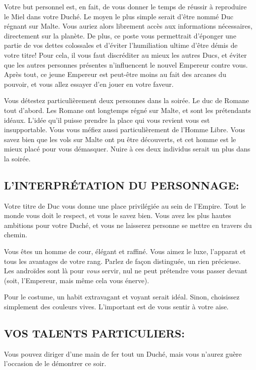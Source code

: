 \documentclass[14pt,twocolumn]{extarticle}
\begin{document}
Votre but personnel est, en fait, de vous donner le temps de réussir à
reproduire le Miel dans votre Duché. Le moyen le plus simple serait d'être
nommé Duc régnant sur Malte. Vous auriez alors librement accès aux informations
nécessaires, directement sur la planète. De plus, ce poste vous permettrait
d'éponger une partie de vos dettes colossales et d'éviter l'humiliation ultime
d'être démis de votre titre! Pour cela, il vous faut discréditer au mieux les
autres Ducs, et éviter que les autres personnes présentes n'influencent le
nouvel Empereur contre vous.  Après tout, ce jeune Empereur est peut-être moins
au fait des arcanes du pouvoir, et vous allez essayer d'en jouer en votre
faveur.

Vous détestez particulièrement deux personnes dans la soirée. Le duc de Romane
tout d'abord. Les Romane ont longtemps régné sur Malte, et sont les prétendants
idéaux. L'idée qu'il puisse prendre la place qui vous revient vous est
insupportable. Vous vous méfiez aussi particulièrement de l'Homme Libre. Vous
savez bien que les vols sur Malte ont pu être découverts, et cet homme est le
mieux placé pour vous démasquer. Nuire à ces deux individus serait un plus dans
la soirée.

\subsection{L'INTERPRÉTATION DU PERSONNAGE:}

Votre titre de Duc vous donne une place privilégiée au sein de l'Empire. Tout
le monde vous doit le respect, et vous le savez bien. Vous avez les plus hautes
ambitions pour votre Duché, et vous ne laisserez personne se mettre en travers
du chemin.

Vous êtes un homme de cour, élégant et raffiné. Vous aimez le luxe, l'apparat
et tous les avantages de votre rang. Parlez de façon distinguée, un rien
précieuse. Les androïdes sont là pour \emph{vous} servir, nul ne peut prétendre
vous passer devant (soit, l'Empereur, mais même cela vous énerve).

Pour le costume, un habit extravagant et voyant serait idéal. Sinon, choisissez
simplement des couleurs vives. L'important est de vous sentir à votre aise.


\subsection{VOS TALENTS PARTICULIERS:}

Vous pouvez diriger d'une main de fer tout un Duché, mais vous n'aurez guère
l'occasion de le démontrer ce soir.
\end{document}
